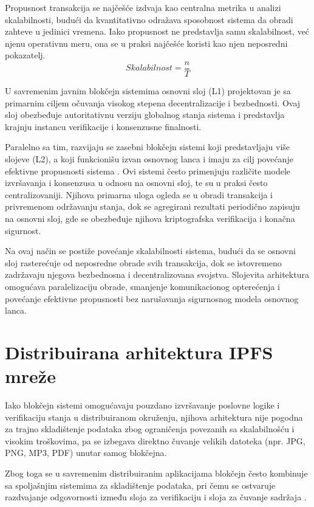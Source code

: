 Propusnost transakcija se najčešće izdvaja kao centralna metrika u analizi skalabilnosti, budući da kvantitativno odražava sposobnost sistema da obradi zahteve u jedinici vremena. Iako propusnost ne predstavlja samu skalabilnost, već njenu operativnu meru, ona se u praksi najčešće koristi kao njen neposredni pokazatelj.
$$ Skalabilnost = \frac{n}{T} $$

U savremenim javnim blokčejn sistemima osnovni sloj (L1) projektovan je sa primarnim ciljem očuvanja visokog stepena decentralizacije i bezbednosti. Ovaj sloj obezbeđuje autoritativnu verziju globalnog stanja sistema i predstavlja krajnju instancu verifikacije i konsenzusne finalnosti.

Paralelno sa tim, razvijaju se zasebni blokčejn sistemi koji predstavljaju više slojeve (L2), a koji funkcionišu izvan osnovnog lanca i imaju za cilj povećanje efektivne propusnosti sistema \cite{sguanci2021layer}. Ovi sistemi često primenjuju različite modele izvršavanja i konsenzusa u odnosu na osnovni sloj, te su u praksi često centralizovaniji. Njihova primarna uloga ogleda se u obradi transakcija i privremenom održavanju stanja, dok se agregirani rezultati periodično zapisuju na osnovni sloj, gde se obezbeđuje njihova kriptografska verifikacija i konačna sigurnost.

Na ovaj način se postiže povećanje skalabilnosti sistema, budući da se osnovni sloj rasterećuje od neposredne obrade svih transakcija, dok se istovremeno zadržavaju njegova bezbednosna i decentralizovana svojstva. Slojevita arhitektura omogućava paralelizaciju obrade, smanjenje komunikacionog opterećenja i povećanje efektivne propusnosti bez narušavanja sigurnosnog modela osnovnog lanca.

\section{Distribuirana arhitektura IPFS mreže}
Iako blokčejn sistemi omogućavaju pouzdano izvršavanje poslovne logike i verifikaciju stanja u distribuiranom okruženju, njihova arhitektura nije pogodna za trajno skladištenje podataka zbog ograničenja povezanih sa skalabilnošću i visokim troškovima, pa se izbegava direktno čuvanje velikih datoteka (npr. JPG, PNG, MP3, PDF) unutar samog blokčejna.

Zbog toga se u savremenim distribuiranim aplikacijama blokčejn često kombinuje sa spoljašnjim sistemima za skladištenje podataka, pri čemu se ostvaruje razdvajanje odgovornosti između sloja za verifikaciju i sloja za čuvanje sadržaja \cite{steichen2018blockchain}.

